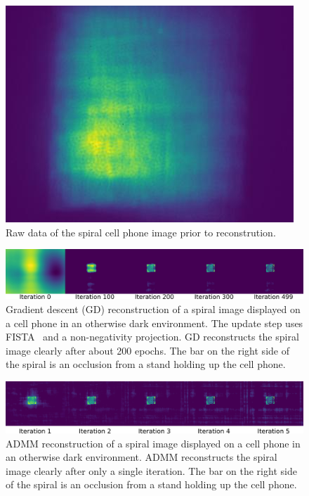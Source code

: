 \documentclass[final]{cvpr}
\begin{document}
\begin{figure}[t]
	\centering
	\includegraphics[width=1.0\linewidth]{images/raw-data-spiral}
	\caption{\label{fig:raw-data-spiral}Raw data of the spiral cell phone
		image prior to reconstrution.}
\end{figure}


\begin{figure}[t]
	\centering
	\includegraphics[width=1.0\linewidth]{images/gd-spiral-reconstruction-500iters}
	\caption{\label{fig:gd-spiral-reconstruction-500iters}
		Gradient descent (GD) reconstruction of a spiral image
		displayed on a cell phone in an otherwise dark environment.
		The update step uses FISTA~\cite{beck2009fast} and a
		non-negativity projection.
		GD reconstructs the spiral image clearly after about 200 epochs.
		The bar on the right side of the spiral is an occlusion from a
		stand holding up the cell phone.}
\end{figure}


\begin{figure}[t]
	\centering
	\includegraphics[width=1.0\linewidth]{images/admm-spiral-reconstruction-5iters}
	\caption{\label{fig:admm-spiral-reconstruction-5iters}
		ADMM reconstruction of a spiral image
		displayed on a cell phone in an otherwise dark environment.
		ADMM reconstructs the spiral image clearly after only a single
		iteration.
		The bar on the right side of the spiral is an occlusion from a
		stand holding up the cell phone.}
\end{figure}
\end{document}
